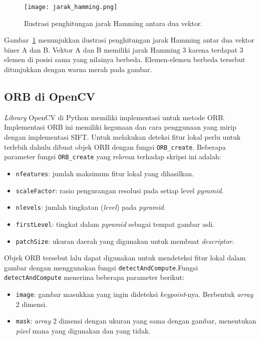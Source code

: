 \begin{figure}[H]
	\centering
	\texttt{[image: jarak\_hamming.png]}
	\caption{Ilustrasi penghitungan jarak Hamming antara dua vektor.}
	\label{fig:jarak_hamming}
\end{figure}

Gambar~\ref{fig:jarak_hamming} menunjukkan ilustrasi penghitungan jarak Hamming antar dua vektor biner A dan B. Vektor A dan B memiliki jarak Hamming 3 karena terdapat 3 elemen di posisi sama yang nilainya berbeda. Elemen-elemen berbeda tersebut ditunjukkan dengan warna merah pada gambar.

\subsection{ORB di OpenCV}
\textit{Library} OpenCV di Python memiliki implementasi untuk metode ORB. Implementasi ORB ini memiliki kegunaan dan cara penggunaan yang mirip dengan implementasi SIFT. Untuk melakukan deteksi fitur lokal perlu untuk terlebih dahulu dibuat objek ORB dengan fungsi \texttt{ORB\_create}. Beberapa parameter fungsi \texttt{ORB\_create} yang relevan terhadap skripsi ini adalah:
\begin{itemize}
	\item \texttt{nfeatures}: jumlah maksimum fitur lokal yang dihasilkan.
	\item \texttt{scaleFactor}: rasio pengurangan resolusi pada setiap level \textit{pyramid}.
	\item \texttt{nlevels}: jumlah tingkatan (\textit{level}) pada \textit{pyramid}.
	\item \texttt{firstLevel}: tingkat dalam \textit{pyramid} sebagai tempat gambar asli.
	\item \texttt{patchSize}: ukuran daerah yang digunakan untuk membuat \textit{descriptor}.
\end{itemize}

Objek ORB tersebut lalu dapat digunakan untuk mendeteksi fitur lokal dalam gambar dengan menggunakan fungsi \texttt{detectAndCompute}.Fungsi \texttt{detectAndCompute} menerima beberapa parameter berikut:
\begin{itemize}
	\item \texttt{image}: gambar masukkan yang ingin dideteksi \textit{keypoint}-nya. Berbentuk \textit{array} 2 dimensi.
	\item \texttt{mask}: \textit{array} 2 dimensi dengan ukuran yang sama dengan gambar, menentukan \textit{pixel} mana yang digunakan dan yang tidak.
\end{itemize}

